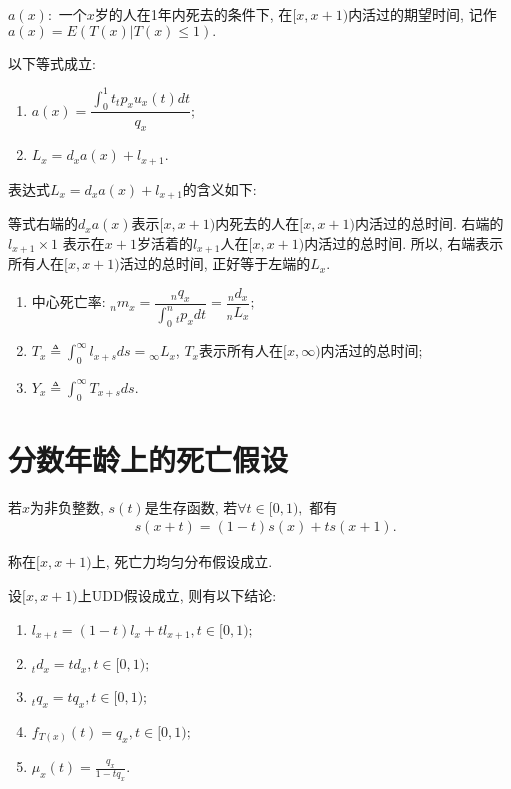 \documentclass[lang=cn,10pt]{elegantbook}
\begin{document}
\begin{definition}
    $a(x):$ 一个$x$岁的人在1年内死去的条件下, 在$[x,x+1)$内活过的期望时间, 记作$a(x)=E(T(x)|T(x)\leq 1).$
\end{definition}

\begin{corollary}以下等式成立:
    \begin{enumerate}
        \item $a(x)=\dfrac {\int_0^1t{}_tp_xu_x(t)dt}{q_x};$
        \item $L_x=d_xa(x)+l_{x+1}.$
    \end{enumerate}
\end{corollary}

\begin{remark}
    表达式$L_x=d_xa(x)+l_{x+1}$的含义如下:

    等式右端的$d_xa(x)$表示$[x,x+1)$内死去的人在$[x,x+1)$内活过的总时间. 右端的$l_{x+1}\times1$ 表示在$x+1$岁活着的$l_{x+1}$人在$[x,x+1)$内活过的总时间. 所以, 右端表示所有人在$[x,x+1)$活过的总时间, 正好等于左端的$L_x.$
\end{remark}

\begin{proposition}
    \begin{enumerate}
        \item 中心死亡率: ${}_nm_x=\dfrac {{}_nq_x}{\int_0^n{}_tp_xdt}=\dfrac{{}_nd_x}{{}_nL_x};$
        \item $T_x\triangleq\int_0^{\infty}l_{x+s}ds={}_{\infty}L_x$, $T_x$表示所有人在$[x,\infty)$内活过的总时间;
        \item $Y_x\triangleq\int_0^{\infty}T_{x+s}ds.$
    \end{enumerate}
\end{proposition}

\section{分数年龄上的死亡假设}
\begin{definition}
    若$x$为非负整数, $s(t)$是生存函数, 若$\forall t\in [0,1),$ 都有
    \begin{align}\label{tula}
         & s(x+t)=(1-t)s(x)+ts(x+1).
    \end{align}

    称在$[x,x+1)$上, 死亡力均匀分布假设成立.
\end{definition}

\begin{corollary}
    设$[x,x+1)$上UDD假设成立, 则有以下结论:
    \begin{enumerate}
        \item $l_{x+t}=(1-t)l_{x}+tl_{x+1},t\in [0,1);$
        \item $_{t}d_{x}=td_{x},t\in [0,1);$
        \item $_{t}q_{x}=tq_{x},t\in [0,1);$
        \item $f_{T(x)}(t)=q_{x},t\in [0,1);$
        \item $\mu_{x}(t)=\frac{q_{x}}{1-tq_x}.$
    \end{enumerate}
\end{corollary}
\end{document}
